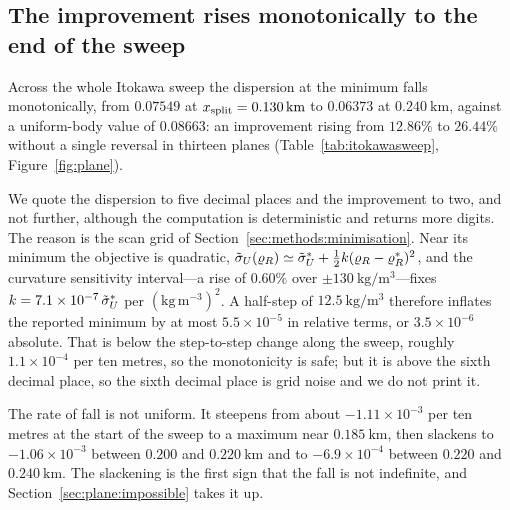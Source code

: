 \subsection{The improvement rises monotonically to the end of the sweep}
\label{sec:plane:monotonic}

Across the whole Itokawa sweep the dispersion at the minimum falls
monotonically, from $0.07549$ at $x_{\mathrm{split}} = \SI{0.130}{\kilo\metre}$ to
$0.06373$ at $\SI{0.240}{\kilo\metre}$, against a uniform-body value of
$0.08663$: an improvement rising from $12.86\%$ to $26.44\%$ without a
single reversal in thirteen planes (Table~\ref{tab:itokawasweep},
Figure~\ref{fig:plane}).

We quote the dispersion to five decimal places and the improvement to two,
and not further, although the computation is deterministic and returns more
digits. The reason is the scan grid of
Section~\ref{sec:methods:minimisation}. Near its minimum the objective is
quadratic, $\tilde{\sigma}_{U}(\varrho_{R}) \simeq \tilde{\sigma}_{U}^{\ast} +
\tfrac{1}{2}k(\varrho_{R}-\varrho_{R}^{\ast})^{2}$, and the curvature sensitivity
interval---a rise of $0.60\%$ over
$\pm\SI{130}{\kilo\gram\per\cubic\metre}$---fixes
$k = 7.1\times10^{-7}\,\tilde{\sigma}_{U}^{\ast}$ per $(\mathrm{kg\,m^{-3}})^{2}$.
A half-step of $\SI{12.5}{\kilo\gram\per\cubic\metre}$ therefore inflates
the reported minimum by at most $5.5\times10^{-5}$ in relative terms, or
$3.5\times10^{-6}$ absolute. That is below the step-to-step change along the
sweep, roughly $1.1\times10^{-4}$ per ten metres, so the monotonicity is
safe; but it is above the sixth decimal place, so the sixth decimal place is
grid noise and we do not print it.

The rate of fall is not uniform. It steepens from about
$-1.11\times10^{-3}$ per ten metres at the start of the sweep to a maximum
near $\SI{0.185}{\kilo\metre}$, then slackens to $-1.06\times10^{-3}$
between $0.200$ and $\SI{0.220}{\kilo\metre}$ and to
$-6.9\times10^{-4}$ between $0.220$ and $\SI{0.240}{\kilo\metre}$. The
slackening is the first sign that the fall is not indefinite, and
Section~\ref{sec:plane:impossible} takes it up.

